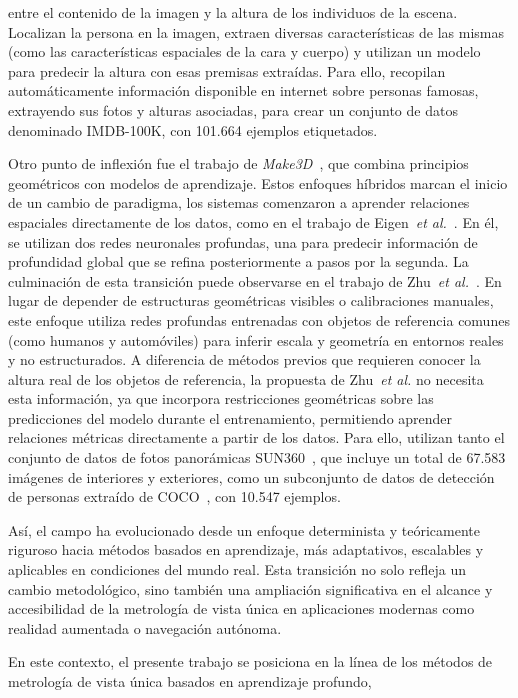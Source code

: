 entre el contenido de la imagen y la altura de los individuos de la escena. Localizan la persona en la imagen, extraen diversas características
de las mismas (como las características espaciales de la cara y cuerpo) y utilizan un modelo para predecir la altura con esas premisas
extraídas. Para ello, recopilan automáticamente información disponible en internet sobre personas famosas, extrayendo sus fotos y
alturas asociadas, para crear un conjunto de datos denominado IMDB-100K, con 101.664 ejemplos etiquetados.
\par
Otro punto de inflexión fue el trabajo de \emph{Make3D}~\cite{Make3D},
que combina principios geométricos con modelos de aprendizaje.  Estos enfoques
híbridos marcan el inicio de un cambio de paradigma,
los sistemas comenzaron a aprender relaciones espaciales directamente de los datos, como en el trabajo de Eigen~\emph{et al.}~\cite{DepthMapMultiScale}.
En él, se utilizan dos redes neuronales profundas, una para predecir información de profundidad global
que se refina posteriormente a pasos por la segunda.
La culminación de esta transición puede observarse en el trabajo de Zhu~\emph{et al.}~\cite{SVMIW}. En lugar de depender de estructuras
geométricas visibles o calibraciones manuales, este enfoque utiliza redes profundas entrenadas con objetos
de referencia comunes (como humanos y automóviles) para inferir escala y geometría en entornos
reales y no estructurados.
A diferencia de métodos previos que requieren conocer la altura real de los objetos de referencia,
la propuesta de Zhu~\emph{et al.} no necesita esta información, ya que incorpora restricciones geométricas
sobre las predicciones del modelo durante el entrenamiento, permitiendo aprender relaciones métricas directamente a
partir de los datos. Para ello, utilizan tanto el conjunto de datos de fotos panorámicas SUN360~\cite{SUN360},
que incluye un total de 67.583 imágenes de interiores y exteriores, como un subconjunto de datos de detección de personas extraído de COCO~\cite{COCO},
con 10.547 ejemplos.
\par
Así, el campo ha evolucionado desde un enfoque determinista y teóricamente riguroso hacia métodos basados en aprendizaje, más adaptativos,
escalables y aplicables en condiciones del mundo real. Esta transición no solo refleja un cambio metodológico, sino también una ampliación
significativa en el alcance y accesibilidad de la metrología de vista única en aplicaciones modernas como realidad aumentada o navegación
autónoma.
\par
En este contexto, el presente trabajo se posiciona en la línea de los métodos de metrología de vista única basados en aprendizaje profundo,
